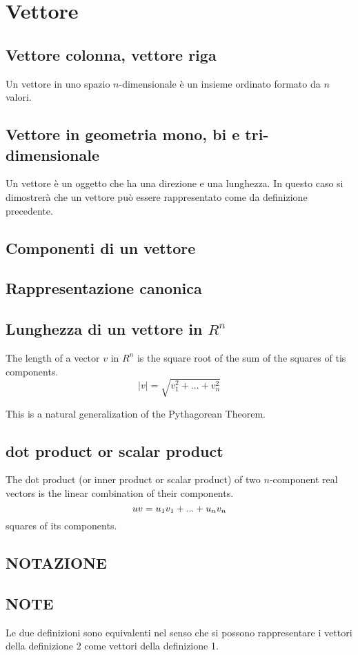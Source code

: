 \section{Vettore}
\subsection{Vettore colonna, vettore riga}
Un vettore in uno spazio $n$-dimensionale è un insieme ordinato formato da $n$ valori. 

\subsection{Vettore in geometria mono, bi e tri-dimensionale}
Un vettore è un oggetto che ha una direzione e una lunghezza. In questo caso si dimostrerà che un vettore può essere
rappresentato come da definizione precedente.

\subsection{Componenti di un vettore}

\subsection{Rappresentazione canonica}

\subsection{Lunghezza di un vettore in $R^n$}
The length of a vector $v$ in $R^n$ is the square root of the sum of the squares of tis components.
\[
 |v|=\sqrt{v^2_1+...+v^2_n}
\]

This is a natural generalization of the Pythagorean Theorem.

\subsection{dot product or scalar product}
The dot product (or inner product or scalar product) of two $n$-component real vectors is the linear combination of their components.
\[
 u \dotfill v = u_1v_1+...+u_nv_n
\]
squares of its components.


\subsection{NOTAZIONE}

\subsection{NOTE}
Le due definizioni sono equivalenti nel senso che si possono rappresentare i vettori della definizione 2 come vettori
della definizione 1.

